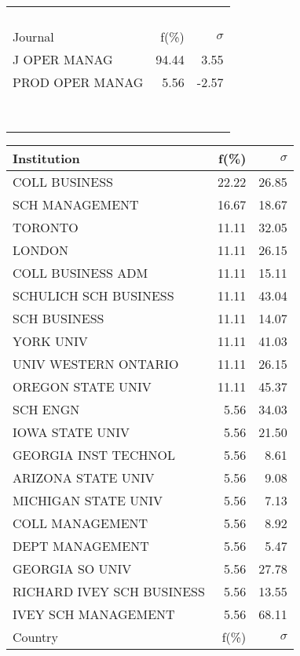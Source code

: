 \documentclass[a4paper,11pt]{report}
\begin{document}
\begin{landscape}
\begin{table}[!ht]
{\begin{tabular}{|l r  r|}
 &  & \\
 &  & \\
 &  & \\
 &  & \\
\hline
\hline
Journal & f(\%) & $\sigma$\\
\hline
J OPER MANAG & 94.44 & 3.55\\
PROD OPER MANAG & 5.56 & -2.57\\
 &  & \\
 &  & \\
 &  & \\
 &  & \\
 &  & \\
 &  & \\
 &  & \\
 &  & \\
\hline
\end{tabular}
}
{\scriptsize\begin{tabular}{|l r r|}
\hline
Institution & f(\%) & $\sigma$\\
\hline
COLL BUSINESS & 22.22 & 26.85\\
SCH MANAGEMENT & 16.67 & 18.67\\
TORONTO & 11.11 & 32.05\\
LONDON & 11.11 & 26.15\\
COLL BUSINESS ADM & 11.11 & 15.11\\
SCHULICH SCH BUSINESS & 11.11 & 43.04\\
SCH BUSINESS & 11.11 & 14.07\\
YORK UNIV & 11.11 & 41.03\\
UNIV WESTERN ONTARIO & 11.11 & 26.15\\
OREGON STATE UNIV & 11.11 & 45.37\\
SCH ENGN & 5.56 & 34.03\\
IOWA STATE UNIV & 5.56 & 21.50\\
GEORGIA INST TECHNOL & 5.56 & 8.61\\
ARIZONA STATE UNIV & 5.56 & 9.08\\
MICHIGAN STATE UNIV & 5.56 & 7.13\\
COLL MANAGEMENT & 5.56 & 8.92\\
DEPT MANAGEMENT & 5.56 & 5.47\\
GEORGIA SO UNIV & 5.56 & 27.78\\
RICHARD IVEY SCH BUSINESS & 5.56 & 13.55\\
IVEY SCH MANAGEMENT & 5.56 & 68.11\\
\hline
\hline
Country & f(\%) & $\sigma$\\

\end{tabular}}
\end{table}
\end{landscape}
\end{document}
